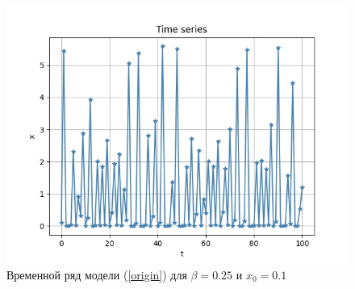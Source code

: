     \begin{figure}
        \centering
        \includegraphics[width=\textwidth]{deterministic/images/time_series_x_0_1_b_0_25.jpg}

        \captionsetup{justification=centering}
        \caption{Временной ряд модели (\ref{origin}) для \(\beta = 0.25\) и \(x_0 = 0.1\)}
        \label{time_series_x_0_1_b_0_25}
    \end{figure}
